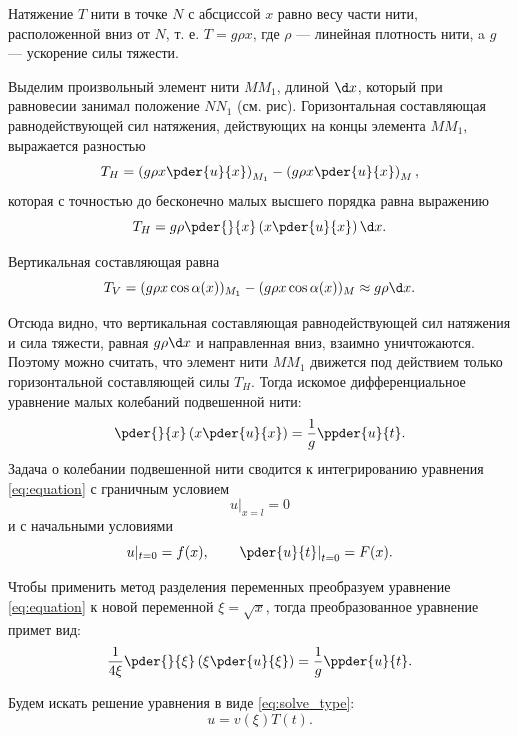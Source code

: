 Натяжение \( T \) нити в точке \( N \) с абсциссой \( x \) равно весу
части нити, расположенной вниз от \( N \), т. е. \( T = g\rho x \), где \( \rho \) --- линейная
плотность нити, a \( g \) --- ускорение силы тяжести.

Выделим произвольный элемент нити \( MM_1 \), длиной \( \d x \), который при
равновесии занимал положение \( NN_1 \) (см. рис). Горизонтальная составляющая
равнодействующей сил натяжения, действующих на концы элемента \( MM_1 \),
выражается разностью
\[
    T_H = \left(g\rho x\pder{u}{x}\right)_{M_1} - \left(g\rho x\pder{u}{x}\right)_M,
\]
которая с точностью до бесконечно малых высшего порядка равна выражению
\[
    T_H = g\rho\pder{}{x}\left(x\pder{u}{x}\right)\d x.
\]

Вертикальная составляющая равна
\[
    T_V = (g\rho x\cos\alpha(x))_{M_1} - (g\rho x\cos\alpha(x))_M \approx g\rho\d x.
\]

Отсюда видно, что вертикальная составляющая равнодействующей сил натяжения
и сила тяжести, равная \( g\rho\d x \) и направленная вниз, взаимно уничтожаются.
Поэтому можно считать, что элемент нити \( MM_1 \) движется под действием
только горизонтальной составляющей силы \( T_H \). Тогда
искомое дифференциальное уравнение малых колебаний подвешенной нити:
\begin{equation}
    \pder{}{x}\left(x\pder{u}{x}\right) = \frac{1}{g}\ppder{u}{t}.
    \label{eq:equation}
\end{equation}
Задача о колебании подвешенной нити сводится к интегрированию уравнения
\eqref{eq:equation} с граничным условием
\begin{equation}
    u|_{x = l} = 0
    \label{condition_corner}
\end{equation}
и с начальными условиями
\begin{equation}
    u|_{t = 0} = f(x), \hspace{2em} \left.\pder{u}{t}\right|_{t = 0} = F(x).
    \label{condition_zero}
\end{equation}

Чтобы применить метод разделения переменных преобразуем уравнение
\eqref{eq:equation} к новой переменной \( \xi = \sqrt{x} \), тогда преобразованное
уравнение примет вид:
\begin{equation}
    \frac{1}{4\xi}\pder{}{\xi}\left(\xi\pder{u}{\xi}\right) = \frac{1}{g}\ppder{u}{t}.
    \label{eq:eq_xi}
\end{equation}

Будем искать решение уравнения в виде \eqref{eq:solve_type}:
\begin{equation}
    u = v(\xi)T(t).
    \label{eq:solve_type}
\end{equation}

